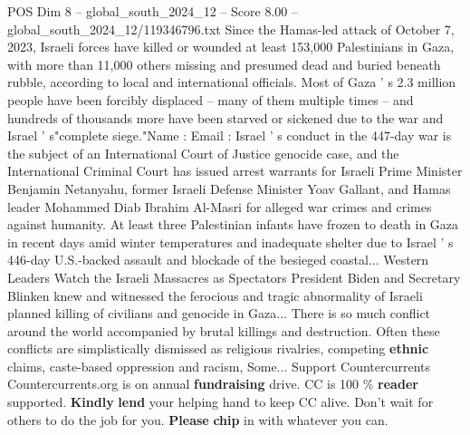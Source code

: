 \begin{textsample}{POS Dim 8 – global\_south\_2024\_12 – Score 8.00 – global\_south\_2024\_12/119346796.txt}
Since the Hamas-led attack of October 7, 2023, Israeli forces have killed or wounded at least 153,000 Palestinians in Gaza, with more than 11,000 others missing and presumed dead and buried beneath rubble, according to local and international officials.
Most of Gaza ' s 2.3 million people have been forcibly displaced -- many of them multiple times -- and hundreds of thousands more have been starved or sickened due to the war and Israel ' s"complete siege."Name : Email : Israel ' s conduct in the 447-day war is the subject of an International Court of Justice genocide case, and the International Criminal Court has issued arrest warrants for Israeli Prime Minister Benjamin Netanyahu, former Israeli Defense Minister Yoav Gallant, and Hamas leader Mohammed Diab Ibrahim Al-Masri for alleged war crimes and crimes against humanity.
At least three Palestinian infants have frozen to death in Gaza in recent days amid winter temperatures and inadequate shelter due to Israel ' s 446-day U.S.-backed assault and blockade of the besieged coastal...
Western Leaders Watch the Israeli Massacres as Spectators President Biden and Secretary Blinken knew and witnessed the ferocious and tragic abnormality of Israeli planned killing of civilians and genocide in Gaza...
There is so much conflict around the world accompanied by brutal killings and destruction.
Often these conflicts are simplistically dismissed as religious rivalries, competing \textbf{ethnic} claims, caste-based oppression and racism, Some...
Support Countercurrents Countercurrents.org is on annual \textbf{fundraising} drive.
CC is 100 \% \textbf{reader} supported. \textbf{Kindly} \textbf{lend} your helping hand to keep CC alive.
Don't wait for others to do the job for you. \textbf{Please} \textbf{chip} in with whatever you can.

\end{textsample}
